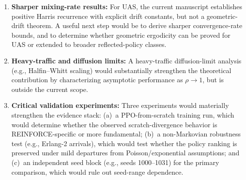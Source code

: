 \begin{enumerate}[label=\textbf{F\arabic*.}, leftmargin=2.2em]
\item \textbf{Sharper mixing-rate results:}
For UAS, the current manuscript establishes positive Harris recurrence with explicit drift constants, but not a geometric-drift theorem. A useful next step would be to derive sharper convergence-rate bounds, and to determine whether geometric ergodicity can be proved for UAS or extended to broader reflected-policy classes.

\item \textbf{Heavy-traffic and diffusion limits:}
A heavy-traffic diffusion-limit analysis (e.g., Halfin--Whitt scaling) would substantially strengthen the theoretical contribution by characterizing asymptotic performance as $\rho \to 1$, but is outside the current scope.

\item \textbf{Critical validation experiments:}
Three experiments would materially strengthen the evidence stack: (a)~a PPO-from-scratch training run, which would determine whether the observed scratch-divergence behavior is REINFORCE-specific or more fundamental; (b)~a non-Markovian robustness test (e.g., Erlang-2 arrivals), which would test whether the policy ranking is preserved under mild departures from Poisson/exponential assumptions; and (c)~an independent seed block (e.g., seeds 1000--1031) for the primary comparison, which would rule out seed-range dependence.
\end{enumerate}
